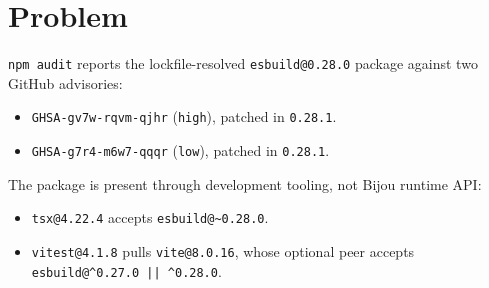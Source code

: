 \section{Problem}\label{record-215-problem}

\texttt{n\allowbreak{}p\allowbreak{}m\allowbreak{} \allowbreak{}a\allowbreak{}u\allowbreak{}d\allowbreak{}i\allowbreak{}t} reports the lockfile-resolved \texttt{e\allowbreak{}s\allowbreak{}b\allowbreak{}u\allowbreak{}i\allowbreak{}l\allowbreak{}d\allowbreak{}@\allowbreak{}0\allowbreak{}.\allowbreak{}2\allowbreak{}8\allowbreak{}.\allowbreak{}0} package against two GitHub advisories:

\begin{itemize}
\tightlist
\item
  \texttt{G\allowbreak{}H\allowbreak{}S\allowbreak{}A\allowbreak{}-\allowbreak{}g\allowbreak{}v\allowbreak{}7\allowbreak{}w\allowbreak{}-\allowbreak{}r\allowbreak{}q\allowbreak{}v\allowbreak{}m\allowbreak{}-\allowbreak{}q\allowbreak{}j\allowbreak{}h\allowbreak{}r} (\texttt{h\allowbreak{}i\allowbreak{}g\allowbreak{}h}), patched in \texttt{0\allowbreak{}.\allowbreak{}2\allowbreak{}8\allowbreak{}.\allowbreak{}1}.
\item
  \texttt{G\allowbreak{}H\allowbreak{}S\allowbreak{}A\allowbreak{}-\allowbreak{}g\allowbreak{}7\allowbreak{}r\allowbreak{}4\allowbreak{}-\allowbreak{}m\allowbreak{}6\allowbreak{}w\allowbreak{}7\allowbreak{}-\allowbreak{}q\allowbreak{}q\allowbreak{}q\allowbreak{}r} (\texttt{l\allowbreak{}o\allowbreak{}w}), patched in \texttt{0\allowbreak{}.\allowbreak{}2\allowbreak{}8\allowbreak{}.\allowbreak{}1}.
\end{itemize}

The package is present through development tooling, not Bijou runtime API:

\begin{itemize}
\tightlist
\item
  \texttt{t\allowbreak{}s\allowbreak{}x\allowbreak{}@\allowbreak{}4\allowbreak{}.\allowbreak{}2\allowbreak{}2\allowbreak{}.\allowbreak{}4} accepts \texttt{e\allowbreak{}s\allowbreak{}b\allowbreak{}u\allowbreak{}i\allowbreak{}l\allowbreak{}d\allowbreak{}@\allowbreak{}\textasciitilde{}\allowbreak{}0\allowbreak{}.\allowbreak{}2\allowbreak{}8\allowbreak{}.\allowbreak{}0}.
\item
  \texttt{v\allowbreak{}i\allowbreak{}t\allowbreak{}e\allowbreak{}s\allowbreak{}t\allowbreak{}@\allowbreak{}4\allowbreak{}.\allowbreak{}1\allowbreak{}.\allowbreak{}8} pulls \texttt{v\allowbreak{}i\allowbreak{}t\allowbreak{}e\allowbreak{}@\allowbreak{}8\allowbreak{}.\allowbreak{}0\allowbreak{}.\allowbreak{}1\allowbreak{}6}, whose optional peer accepts \texttt{e\allowbreak{}s\allowbreak{}b\allowbreak{}u\allowbreak{}i\allowbreak{}l\allowbreak{}d\allowbreak{}@\allowbreak{}\textasciicircum{}\allowbreak{}0\allowbreak{}.\allowbreak{}2\allowbreak{}7\allowbreak{}.\allowbreak{}0\allowbreak{} \allowbreak{}|\allowbreak{}|\allowbreak{} \allowbreak{}\textasciicircum{}\allowbreak{}0\allowbreak{}.\allowbreak{}2\allowbreak{}8\allowbreak{}.\allowbreak{}0}.
\end{itemize}

